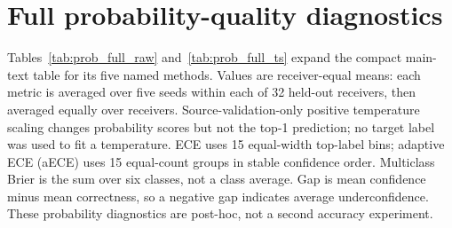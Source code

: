 \documentclass[11pt]{article}
\begin{document}
\section{Full probability-quality diagnostics}
Tables~\ref{tab:prob_full_raw} and~\ref{tab:prob_full_ts} expand the compact main-text table for its five named methods. Values are receiver-equal means: each metric is averaged over five seeds within each of 32 held-out receivers, then averaged equally over receivers. Source-validation-only positive temperature scaling changes probability scores but not the top-1 prediction; no target label was used to fit a temperature. ECE uses 15 equal-width top-label bins; adaptive ECE (aECE) uses 15 equal-count groups in stable confidence order. Multiclass Brier is the sum over six classes, not a class average. Gap is mean confidence minus mean correctness, so a negative gap indicates average underconfidence. These probability diagnostics are post-hoc, not a second accuracy experiment.
\end{document}
